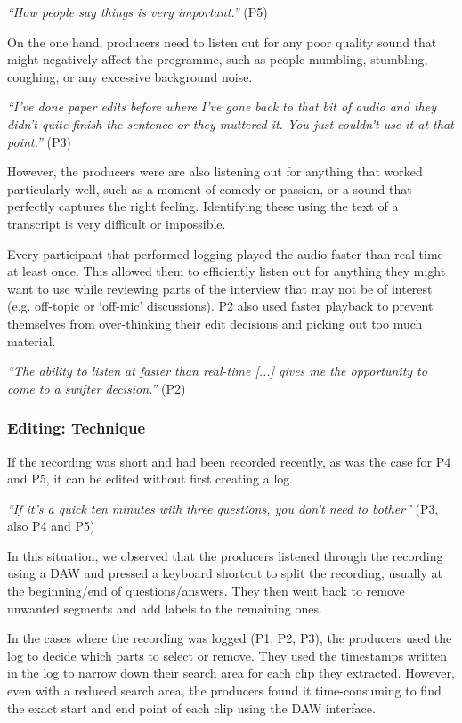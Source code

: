 \textit{``How people say things is very important.''} (P5)

On the one hand, producers need to listen out for any poor quality sound that might negatively affect the programme,
such as people mumbling, stumbling, coughing, or any excessive background noise. 

\textit{``I've done paper edits before where I've gone back to that bit of audio and they didn't quite finish the
  sentence or they muttered it. You just couldn't use it at that point.''} (P3)

However, the producers were are also listening out for anything that worked particularly well, such as a moment of
comedy or passion, or a sound that perfectly captures the right feeling. Identifying these using the text of a
transcript is very difficult or impossible. 

Every participant that performed logging played the audio faster than real time at least once. This allowed them to
efficiently listen out for anything they might want to use while reviewing parts of the interview that may not be of
interest (e.g. off-topic or `off-mic' discussions).  P2 also used faster playback to prevent themselves from
over-thinking their edit decisions and picking out too much material.

\textit{``The ability to listen at faster than real-time [...] gives me the opportunity to come to a swifter decision.''}
(P2)


\subsubsection{Editing: Technique}

If the recording was short and had been recorded recently, as was the case for P4 and P5, it can be edited
without first creating a log.

\textit{``If it's a quick ten minutes with three questions, you don't need to bother''} (P3, also P4 and P5)

In this situation, we observed that the producers listened through the recording using a
DAW and pressed a keyboard shortcut to split the recording, usually at the beginning/end of questions/answers. They
then went back to remove unwanted segments and add labels to the remaining ones.

In the cases where the recording was logged (P1, P2, P3), the producers used the log to decide which parts to select or
remove. They used the timestamps written in the log to narrow down their search area for each clip they extracted.
However, even with a reduced search area, the producers found it time-consuming to find the exact start and end point
of each clip using the DAW interface.


